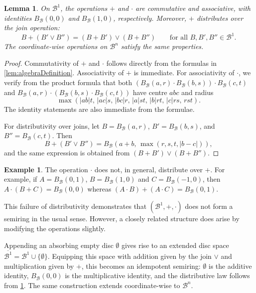 \documentclass[10pt]{article}
\newtheorem{lemma}[theorem]{Lemma}
\theoremstyle{definition}
\newtheorem{example}[theorem]{Example}
\begin{document}
\begin{lemma}
  \label{lem:algebraRules}
    On $\mathcal B^1$, the operations $+$ and $\cdot$ are commutative and associative, with identities
    $B_{\mathcal{B}}(0,0)$ and $B_{\mathcal{B}}(1,0)$, respectively.  Moreover, $+$ distributes over the join operation:
    \[
      B+(B'\vee B'')=(B+B')\vee(B+B'') \qquad\text{for all }B,B',B''\in\mathcal B^1.
    \]
    The coordinate-wise operations on $\mathcal B^n$ satisfy the same properties.
\end{lemma}
\begin{proof}
Commutativity of $+$ and $\cdot$ follows directly from the formulas in
\cref{lem:algebraDefinition}. Associativity of $+$ is immediate.  For
associativity of $\cdot$, we verify from the product formula that both
$(B_{\mathcal{B}}(a,r)\cdot B_{\mathcal{B}}(b,s))\cdot B_{\mathcal{B}}(c,t)$
and
$B_{\mathcal{B}}(a,r)\cdot (B_{\mathcal{B}}(b,s)\cdot B_{\mathcal{B}}(c,t))$
have centre $abc$ and radius
\[
  \max(|ab|t,\,  |ac|s,\,  |bc|r,\,  |a|st,\,  |b|rt,\, |c|rs,\, rst).
\]
The identity statements are also immediate from the formulae.

For distributivity over joins, let
$B=B_{\mathcal{B}}(a,r)$, $B'=B_{\mathcal{B}}(b,s)$, and
$B''=B_{\mathcal{B}}(c,t)$.  Then
\[
  B+(B'\vee B'')=B_{\mathcal{B}}(a+b,\, \max(r,s,t,|b-c|)),
\]
and the same expression is obtained from $(B+B')\vee(B+B'')$.
\end{proof}

\begin{example}
  The operation $\cdot$ does not, in general, distribute over $+$. For example,
if $A=B_{\mathcal{B}}(0,1)$, $B=B_{\mathcal{B}}(1,0)$ and
$C=B_{\mathcal{B}}(-1,0)$, then $A\cdot(B+C)=B_{\mathcal{B}}(0,0)$
whereas $(A\cdot B)+(A\cdot C)=B_{\mathcal{B}}(0,1)$.
\end{example}

This failure of distributivity demonstrates that $(\mathcal B^1,+,\cdot)$ does not form a semiring in the usual sense. However, a closely related structure does arise by modifying the operations slightly.

Appending an absorbing empty disc $\emptyset$
gives rise to an extended disc space $\overline{\mathcal B^1}=\mathcal B^1\cup\{\emptyset\}$. Equipping this space with addition given by the join $\vee$ and multiplication given by $+$, this becomes an idempotent semiring: $\emptyset$ is the additive identity, $B_{\mathcal{B}}(0,0)$ is the multiplicative identity, and the distributive law follows from \cref{lem:algebraRules}. The same construction extends coordinate-wise to $\mathcal B^n$.
\end{document}
